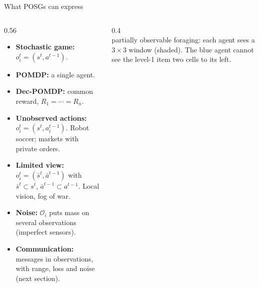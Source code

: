 \documentclass[aspectratio=169,11pt]{beamer}
\begin{document}
\begin{frame}{What POSGs can express}
  \begin{columns}[T]
    \begin{column}{0.56\textwidth}
      \small
      \begin{itemize}
        \item \textbf{Stochastic game:} $o_i^t = (s^t, a^{t-1})$.
        \item \textbf{POMDP:} a single agent.
        \item \textbf{Dec-POMDP:} common reward, $R_1 = \cdots = R_n$.
        \item \textbf{Unobserved actions:} $o_i^t = (s^t, a_i^{t-1})$. Robot soccer; markets with private orders.
        \item \textbf{Limited view:} $o_i^t = (\bar s^t, \bar a^{t-1})$ with $\bar s^t \subset s^t$, $\bar a^{t-1} \subset a^{t-1}$. Local vision, fog of war.
        \item \textbf{Noise:} $\mathcal{O}_i$ puts mass on several observations (imperfect sensors).
        \item \textbf{Communication:} messages in observations, with range, loss and noise (next section).
      \end{itemize}
    \end{column}
    \begin{column}{0.4\textwidth}
      \centering
      \\[3pt]
      {\scriptsize partially observable foraging: each agent sees a $3 \times 3$ window (shaded). The blue agent cannot see the level-1 item two cells to its left.}
    \end{column}
  \end{columns}
\end{frame}
\end{document}
